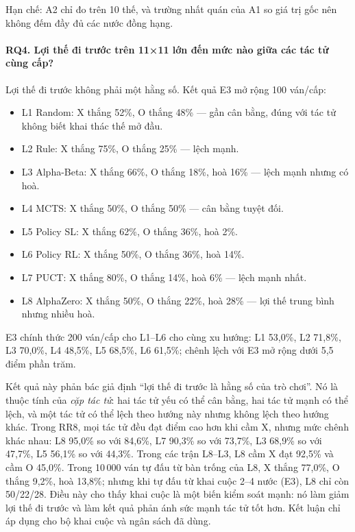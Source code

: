 Hạn chế: A2 chỉ đo trên 10 thế, và trường nhất quán của A1 so giá trị gốc nên không đếm đầy đủ các
nước đồng hạng.

\paragraph{RQ4. Lợi thế đi trước trên 11×11 lớn đến mức nào giữa các tác tử cùng cấp?}
Lợi thế đi trước không phải một hằng số. Kết quả E3 mở rộng 100 ván/cấp:
\begin{itemize}
  \item L1 Random: X thắng 52\%, O thắng 48\% — gần cân bằng, đúng với tác tử không biết khai
        thác thế mở đầu.
  \item L2 Rule: X thắng 75\%, O thắng 25\% — lệch mạnh.
  \item L3 Alpha-Beta: X thắng 66\%, O thắng 18\%, hoà 16\% — lệch mạnh nhưng có hoà.
  \item L4 MCTS: X thắng 50\%, O thắng 50\% — cân bằng tuyệt đối.
  \item L5 Policy SL: X thắng 62\%, O thắng 36\%, hoà 2\%.
  \item L6 Policy RL: X thắng 50\%, O thắng 36\%, hoà 14\%.
  \item L7 PUCT: X thắng 80\%, O thắng 14\%, hoà 6\% — lệch mạnh nhất.
  \item L8 AlphaZero: X thắng 50\%, O thắng 22\%, hoà 28\% — lợi thế trung bình nhưng nhiều hoà.
\end{itemize}
E3 chính thức 200 ván/cấp cho L1--L6 cho cùng xu hướng: L1 53,0\%, L2 71,8\%, L3 70,0\%, L4
48,5\%, L5 68,5\%, L6 61,5\%; chênh lệch với E3 mở rộng dưới 5,5 điểm phần trăm.

Kết quả này phản bác giả định ``lợi thế đi trước là hằng số của trò chơi''. Nó là thuộc tính
của \emph{cặp tác tử}: hai tác tử yếu có thể cân bằng, hai tác tử mạnh có thể lệch, và một tác
tử có thể lệch theo hướng này nhưng không lệch theo hướng khác. Trong RR8, mọi tác tử đều đạt
điểm cao hơn khi cầm X, nhưng mức chênh khác nhau: L8 95,0\% so với 84,6\%, L7 90,3\% so với
73,7\%, L3 68,9\% so với 47,7\%, L5 56,1\% so với 44,3\%. Trong các trận L8--L3, L8 cầm X đạt
92,5\% và cầm O 45,0\%. Trong 10\,000 ván tự đấu từ bàn trống của L8, X thắng 77,0\%, O thắng
9,2\%, hoà 13,8\%; nhưng khi tự đấu từ khai cuộc 2--4 nước (E3), L8 chỉ còn 50/22/28. Điều này
cho thấy khai cuộc là một biến kiểm soát mạnh: nó làm giảm lợi thế đi trước và làm kết quả phản
ánh sức mạnh tác tử tốt hơn. Kết luận chỉ áp dụng cho bộ khai cuộc và ngân sách đã dùng.

